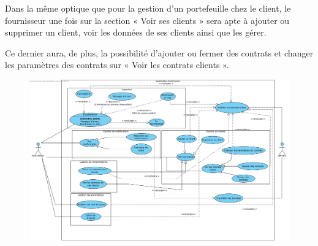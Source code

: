Dans la même optique que pour la gestion d’un portefeuille chez le client, le fournisseur une fois sur la section « Voir ses clients » sera apte à ajouter ou supprimer un client, voir les données de ses clients ainsi que les gérer.
\newline
\newline

Ce dernier aura, de plus, la possibilité d’ajouter ou fermer des contrats et changer les paramètres des contrats sur « Voir les contrats clients ».

\begin{figure}[h]
\centering
\includegraphics[width = 1\textwidth]{use_case/fournisseur.png}
\end{figure}
